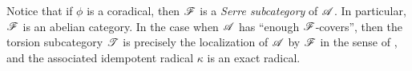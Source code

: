 \begin{rmk}
Notice that if $\phi$ is a coradical, then 
$\mathscr{F}$ is a \emph{Serre subcategory} of $\mathscr{A}$. In particular,
$\mathscr{F}$ is an abelian category. In the case 
when $\mathscr{A}$ has ``enough $\mathscr{F}$-covers'', then the torsion 
subcategory $\mathscr{T}$ is precisely the localization of $\mathscr{A}$ 
by $\mathscr{F}$ in the sense of \cite{Swan}, and the associated 
idempotent radical $\kappa$ is an exact radical.
\end{rmk}
